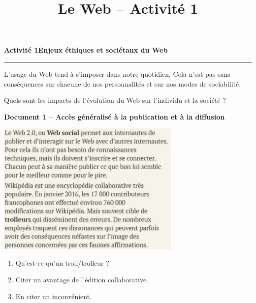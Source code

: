 \documentclass[a4paper]{article}
\begin{document}
\title{Le Web -- Activité 1}

\pagestyle{empty}

\date{}
\author{}

\maketitle{}

\thispagestyle{empty}
\noindent\textbf{Activité 1}\hfill{}\textbf{Enjeux éthiques et sociétaux du Web}
\smallskip
\hrule
\medskip

L'usage du Web tend à s'imposer dans notre quotidien. Cela n'est pas sans conséquences sur chacune de nos personnalités et sur nos modes de sociabilité.

\begin{center}
  Quels sont les impacts de l'évolution du Web sur l'individu et la société ?
\end{center}

\medskip

\textbf{Document 1 -- Accès généralisé à la publication et à la diffusion} 

\begin{multicols}{2}
  \begin{center}
    \includegraphics[width=9cm]{web_2.0.png}
  \end{center}\columnbreak

  \vspace*{-3mm}

  \begin{enumerate}
    \item Qu'est-ce qu'un troll/trolleur ?
    \item Citer un avantage de l'édition collaborative.
    \item En citer un inconvénient.
  \end{enumerate}
\end{multicols}
\end{document}

